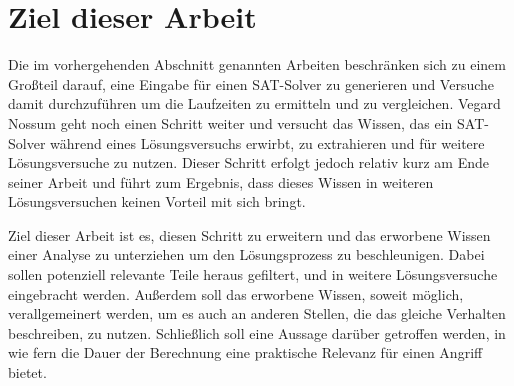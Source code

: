 \section{Ziel dieser Arbeit}
\label{sec:ziel}

Die im vorhergehenden Abschnitt genannten Arbeiten beschränken sich zu einem Großteil darauf, eine Eingabe für
einen SAT-Solver zu generieren und Versuche damit durchzuführen um die Laufzeiten zu ermitteln und zu vergleichen.
Vegard Nossum geht noch einen Schritt weiter und versucht das Wissen, das ein SAT-Solver während eines Lösungsversuchs
erwirbt, zu extrahieren und für weitere Lösungsversuche zu nutzen. Dieser Schritt erfolgt jedoch relativ kurz am Ende
seiner Arbeit und führt zum Ergebnis, dass dieses Wissen in weiteren Lösungsversuchen keinen Vorteil mit sich bringt.

Ziel dieser Arbeit ist es, diesen Schritt zu erweitern und das erworbene Wissen einer Analyse zu unterziehen um den
Lösungsprozess zu beschleunigen. Dabei sollen potenziell relevante Teile heraus gefiltert, und in weitere Lösungsversuche
eingebracht werden. Außerdem soll das erworbene Wissen, soweit möglich, verallgemeinert werden, um es auch an anderen Stellen,
die das gleiche Verhalten beschreiben, zu nutzen. Schließlich soll eine Aussage darüber getroffen werden, in wie fern die Dauer
der Berechnung eine praktische Relevanz für einen Angriff bietet.